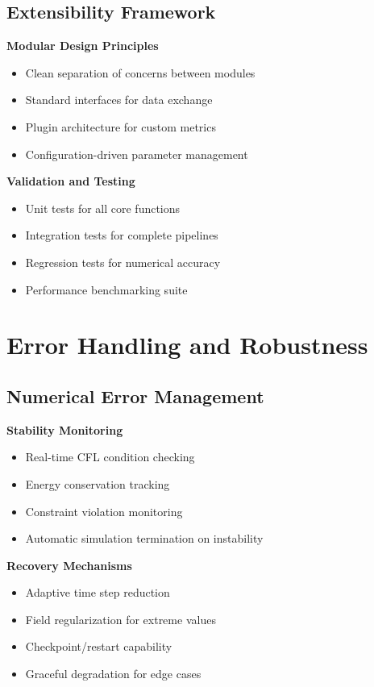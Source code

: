 \documentclass[11pt]{article}
\begin{document}
\subsection{Extensibility Framework}

\textbf{Modular Design Principles}
\begin{itemize}
\item Clean separation of concerns between modules
\item Standard interfaces for data exchange
\item Plugin architecture for custom metrics
\item Configuration-driven parameter management
\end{itemize}

\textbf{Validation and Testing}
\begin{itemize}
\item Unit tests for all core functions
\item Integration tests for complete pipelines
\item Regression tests for numerical accuracy
\item Performance benchmarking suite
\end{itemize}

\section{Error Handling and Robustness}

\subsection{Numerical Error Management}

\textbf{Stability Monitoring}
\begin{itemize}
\item Real-time CFL condition checking
\item Energy conservation tracking
\item Constraint violation monitoring
\item Automatic simulation termination on instability
\end{itemize}

\textbf{Recovery Mechanisms}
\begin{itemize}
\item Adaptive time step reduction
\item Field regularization for extreme values
\item Checkpoint/restart capability
\item Graceful degradation for edge cases
\end{itemize}
\end{document}
